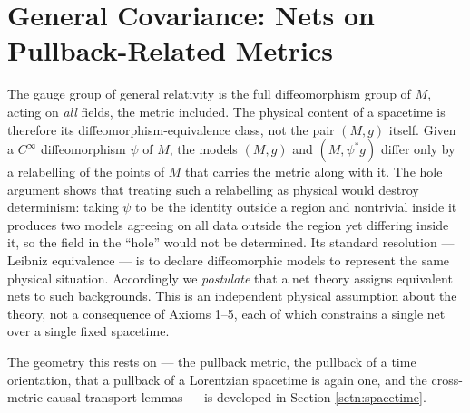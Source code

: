 \section{General Covariance: Nets on Pullback-Related Metrics}\label{sctn:general-covariance-in-curved-spacetime}

The gauge group of general relativity is the full diffeomorphism group of $M$, acting on \emph{all} fields, the metric included. The physical content of a spacetime is therefore its diffeomorphism-equivalence class, not the pair $(M,g)$ itself. Given a $C^\infty$ diffeomorphism $\psi$ of $M$, the models $(M,g)$ and $(M, \psi^*g)$ differ only by a relabelling of the points of $M$ that carries the metric along with it. The hole argument shows that treating such a relabelling as physical would destroy determinism: taking $\psi$ to be the identity outside a region and nontrivial inside it produces two models agreeing on all data outside the region yet differing inside it, so the field in the ``hole'' would not be determined. Its standard resolution --- Leibniz equivalence --- is to declare diffeomorphic models to represent the same physical situation. Accordingly we \emph{postulate} that a net theory assigns equivalent nets to such backgrounds. This is an independent physical assumption about the theory, not a consequence of Axioms 1--5, each of which constrains a single net over a single fixed spacetime.

The geometry this rests on --- the pullback metric, the pullback of a time orientation, that a pullback of a Lorentzian spacetime is again one, and the cross-metric causal-transport lemmas --- is developed in Section \ref{sctn:spacetime}.

